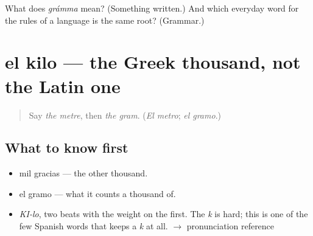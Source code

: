 \begin{tcolorbox}[breakable,colback=teal!4,colframe=teal!35!black,title={Before you move on}]
What does \emph{grámma} mean? (Something written.) And which everyday word for the rules of a language is the same root? (Grammar.)
\end{tcolorbox}
\section[el kilo]{el kilo — the Greek thousand, not the Latin one}

\label{lesson:ES-C359-kilo}



\begin{quote}
Say \emph{the metre}, then \emph{the gram}. (\emph{El metro}; \emph{el gramo}.)
\end{quote}

\subsection*{What to know first}
\begin{itemize}
\raggedright
  \item mil gracias — the other thousand.
  \item el gramo — what it counts a thousand of.
\end{itemize}

\begin{sounds}
\begin{itemize}
\raggedright
  \item \emph{KI-lo}, two beats with the weight on the first. The \emph{k} is hard; this is one of the few Spanish words that keeps a \emph{k} at all. $\to$ pronunciation reference
\end{itemize}
\end{sounds}

